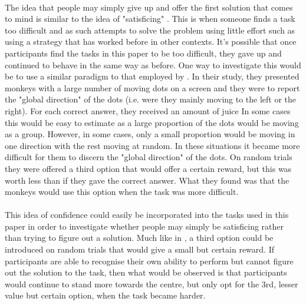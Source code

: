 \documentclass[12pt]{article}
\begin{document}
\paragraph{} The idea that people may simply give up and offer the first solution that comes to mind is similar to the idea of "satisficing" \citep{simon1990invariants}. This is when someone finds a task too difficult and as such attempts to solve the problem using little effort such as using a strategy that has worked before in other contexts. It's possible that once participants find the tasks in this paper to be too difficult, they gave up and continued to behave in the same way as before. One way to investigate this would be to use a similar paradigm to that employed by \cite{Kiani759}. In their study, they presented monkeys with a large number of moving dots on a screen and they were to report the "global direction" of the dots (i.e. were they mainly moving to the left or the right). For each correct answer, they received an amount of juice In some cases this would be easy to estimate as a large proportion of the dots would be moving as a group. However, in some cases, only a small proportion would be moving in one direction with the rest moving at random. In these situations it became more difficult for them to discern the "global direction" of the dots. On random trials they were offered a third option that would offer a certain reward, but this was worth less than if they gave the correct answer. What they found was that the monkeys would use this option when the task was more difficult. 

\paragraph{} This idea of confidence could easily be incorporated into the tasks used in this paper in order to investigate whether people may simply be satisficing rather than trying to figure out a solution. Much like in \cite{Kiani759}, a third option could be introduced on random trials that would give a small but certain reward. If participants are able to recognise their own ability to perform but cannot figure out the solution to the task, then what would be observed is that participants would continue to stand more towards the centre, but only opt for the 3rd, lesser value but certain option, when the task became harder. 
\end{document}
